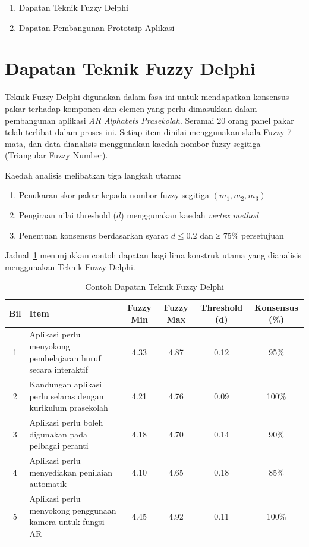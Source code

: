 {{\begin{enumerate}
  \item Dapatan Teknik Fuzzy Delphi
  \item Dapatan Pembangunan Prototaip Aplikasi
\end{enumerate}
\section{Dapatan Teknik Fuzzy Delphi}

Teknik Fuzzy Delphi digunakan dalam fasa ini untuk mendapatkan konsensus pakar terhadap komponen dan elemen yang perlu dimasukkan dalam pembangunan aplikasi \textit{AR Alphabets Prasekolah}. Seramai 20 orang panel pakar telah terlibat dalam proses ini. Setiap item dinilai menggunakan skala Fuzzy 7 mata, dan data dianalisis menggunakan kaedah nombor fuzzy segitiga (Triangular Fuzzy Number).

Kaedah analisis melibatkan tiga langkah utama:

\begin{enumerate}
  \item Penukaran skor pakar kepada nombor fuzzy segitiga \((m_1, m_2, m_3)\)
  \item Pengiraan nilai threshold (\(d\)) menggunakan kaedah \textit{vertex method}
  \item Penentuan konsensus berdasarkan syarat \(d \leq 0.2\) dan ≥ 75\% persetujuan
\end{enumerate}

Jadual~\ref{jadual:fuzzyDelphi} menunjukkan contoh dapatan bagi lima konstruk utama yang dianalisis menggunakan Teknik Fuzzy Delphi.

\begin{table}[H]
\centering
\caption{Contoh Dapatan Teknik Fuzzy Delphi}
\label{jadual:fuzzyDelphi}
\begin{tabular}{|c|p{6cm}|c|c|c|c|}
\hline
\textbf{Bil} & \textbf{Item} & \textbf{Fuzzy Min} & \textbf{Fuzzy Max} & \textbf{Threshold (d)} & \textbf{Konsensus (\%)} \\
\hline
1 & Aplikasi perlu menyokong pembelajaran huruf secara interaktif & 4.33 & 4.87 & 0.12 & 95\% \\
\hline
2 & Kandungan aplikasi perlu selaras dengan kurikulum prasekolah & 4.21 & 4.76 & 0.09 & 100\% \\
\hline
3 & Aplikasi perlu boleh digunakan pada pelbagai peranti & 4.18 & 4.70 & 0.14 & 90\% \\
\hline
4 & Aplikasi perlu menyediakan penilaian automatik & 4.10 & 4.65 & 0.18 & 85\% \\
\hline
5 & Aplikasi perlu menyokong penggunaan kamera untuk fungsi AR & 4.45 & 4.92 & 0.11 & 100\% \\
\hline
\end{tabular}
\end{table}

}}
